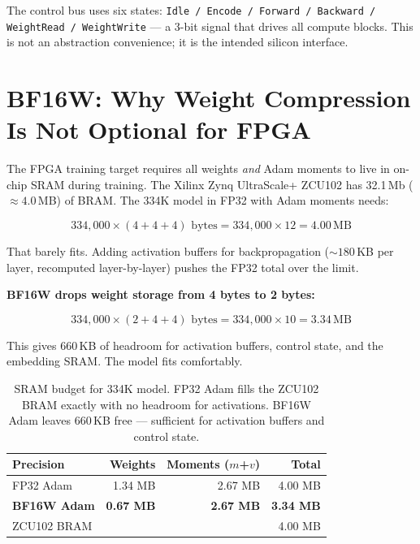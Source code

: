 \documentclass[11pt]{article}
\begin{document}
The control bus uses six states: \texttt{Idle / Encode / Forward / Backward /
WeightRead / WeightWrite} --- a 3-bit signal that drives all compute blocks.
This is not an abstraction convenience; it is the intended silicon interface.

\section{BF16W: Why Weight Compression Is Not Optional for FPGA}

\label{sec:bf16w}

The FPGA training target requires all weights \emph{and} Adam moments to live in
on-chip SRAM during training. The Xilinx Zynq UltraScale+ ZCU102 has 32.1\,Mb
($\approx 4.0$\,MB) of BRAM. The 334K model in FP32 with Adam moments needs:

\[
334{,}000 \times (4 + 4 + 4) \text{ bytes} = 334{,}000 \times 12 = 4.00\,\text{MB}
\]

That barely fits. Adding activation buffers for backpropagation ($\sim 180$\,KB per layer,
recomputed layer-by-layer) pushes the FP32 total over the limit.

\textbf{BF16W drops weight storage from 4 bytes to 2 bytes:}

\[
334{,}000 \times (2 + 4 + 4) \text{ bytes} = 334{,}000 \times 10 = 3.34\,\text{MB}
\]

This gives 660\,KB of headroom for activation buffers, control state, and the
embedding SRAM. The model fits comfortably.

\begin{table}[ht]
\centering
\begin{tabular}{lrrr}
\toprule
Precision & Weights & Moments ($m$+$v$) & Total \\
\midrule
FP32 Adam & 1.34 MB & 2.67 MB & 4.00 MB \\
\textbf{BF16W Adam} & \textbf{0.67 MB} & \textbf{2.67 MB} & \textbf{3.34 MB} \\
\midrule
ZCU102 BRAM & & & 4.00 MB \\
\bottomrule
\end{tabular}
\caption{SRAM budget for 334K model. FP32 Adam fills the ZCU102 BRAM exactly with no
headroom for activations. BF16W Adam leaves 660\,KB free --- sufficient for activation
buffers and control state.}
\end{table}
\end{document}
